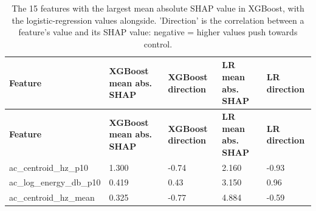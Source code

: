 \documentclass[11pt,a4paper]{article}
\begin{document}
\begin{center}\small\renewcommand{\arraystretch}{1.15}
\begin{longtable}{>{\raggedright\arraybackslash}p{4.20cm}>{\raggedleft\arraybackslash}p{2.55cm}>{\raggedleft\arraybackslash}p{2.55cm}>{\raggedleft\arraybackslash}p{2.55cm}>{\raggedleft\arraybackslash}p{2.55cm}}
\caption{The 15 features with the largest mean absolute SHAP value in XGBoost, with the logistic-regression values alongside. 'Direction' is the correlation between a feature's value and its SHAP value: negative = higher values push towards control.}\\
\toprule
\textbf{\hspace{0pt}Feature} & \textbf{\hspace{0pt}XGBoost mean abs. SHAP} & \textbf{\hspace{0pt}XGBoost direction} & \textbf{\hspace{0pt}LR mean abs. SHAP} & \textbf{\hspace{0pt}LR direction}\\\midrule\endfirsthead
\toprule
\textbf{\hspace{0pt}Feature} & \textbf{\hspace{0pt}XGBoost mean abs. SHAP} & \textbf{\hspace{0pt}XGBoost direction} & \textbf{\hspace{0pt}LR mean abs. SHAP} & \textbf{\hspace{0pt}LR direction}\\\midrule\endhead
\bottomrule\endfoot
\hspace{0pt}ac\_\allowbreak{}centroid\_\allowbreak{}hz\_\allowbreak{}p10 & \hspace{0pt}1.300 & \hspace{0pt}-0.74 & \hspace{0pt}2.160 & \hspace{0pt}-0.93\\
\hspace{0pt}ac\_\allowbreak{}log\_\allowbreak{}energy\_\allowbreak{}db\_\allowbreak{}p10 & \hspace{0pt}0.419 & \hspace{0pt}0.43 & \hspace{0pt}3.150 & \hspace{0pt}0.96\\
\hspace{0pt}ac\_\allowbreak{}centroid\_\allowbreak{}hz\_\allowbreak{}mean & \hspace{0pt}0.325 & \hspace{0pt}-0.77 & \hspace{0pt}4.884 & \hspace{0pt}-0.59\\

\end{longtable}
\end{center}
\end{document}
